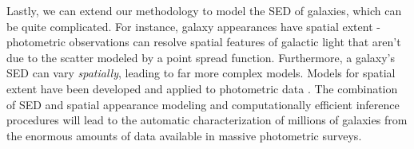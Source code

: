 \documentclass{article}
\begin{document}
Lastly, we can extend our methodology to model the SED of galaxies, which can be quite complicated.  For instance, galaxy appearances have spatial extent - photometric observations can resolve spatial features of galactic light that aren't due to the scatter modeled by a point spread function.  Furthermore, a galaxy's SED can vary \emph{spatially}, leading to far more complex models.  Models for spatial extent have been developed and applied to photometric data \cite{hogg2013replacing, regier2015}.  The combination of SED and spatial appearance modeling and computationally efficient inference procedures will lead to the automatic characterization of millions of galaxies from the enormous amounts of data available in massive photometric surveys.  

 





\end{document}
